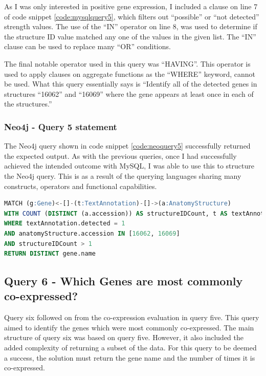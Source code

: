 As I was only interested in positive gene expression, I included a clause on line 7 of code snippet \ref{code:mysqlquery5}, which filters out ``possible'' or ``not detected'' strength values. The use of the ``IN'' operator on line 8, was used to determine if the structure ID value matched any one of the values in the given list. The ``IN'' clause can be used to replace many ``OR'' conditions.

The final notable operator used in this query was ``HAVING''. This operator is used to apply clauses on aggregate functions as the ``WHERE'' keyword, cannot be used. What this query essentially says is ``Identify all of the detected genes in structures ``16062'' and ``16069'' where the gene appears at least once in each of the structures.''

\subsubsection*{Neo4j - Query 5 statement}\label{neoquery5statement}
The Neo4j query shown in code snippet \ref{code:neoquery5} successfully returned the expected output. As with the previous queries, once I had successfully achieved the intended outcome with MySQL, I was able to use this to structure the Neo4j query. This is as a result of the querying languages sharing many constructs, operators and functional capabilities.

\begin{lstlisting}[language=SQL, caption=Neo4j query 5 statement. Which Genes are stored in structures X and Y?., label=code:neoquery5]
MATCH (g:Gene)<-[]-(t:TextAnnotation)-[]->(a:AnatomyStructure)
WITH COUNT (DISTINCT (a.accession)) AS structureIDCount, t AS textAnnotation, a AS anatomyStructure, g AS gene
WHERE textAnnotation.detected = 1
AND anatomyStructure.accession IN [16062, 16069]
AND structureIDCount > 1
RETURN DISTINCT gene.name
\end{lstlisting}

\subsection*{Query 6 - Which Genes are most commonly co-expressed?}\label{query6}
Query six followed on from the co-expression evaluation in query five. This query aimed to identify the genes which were most commonly co-expressed. The main structure of query six was based on query five. However, it also included the added complexity of returning a subset of the data. For this query to be deemed a success, the solution must return the gene name and the number of times it is co-expressed. 

